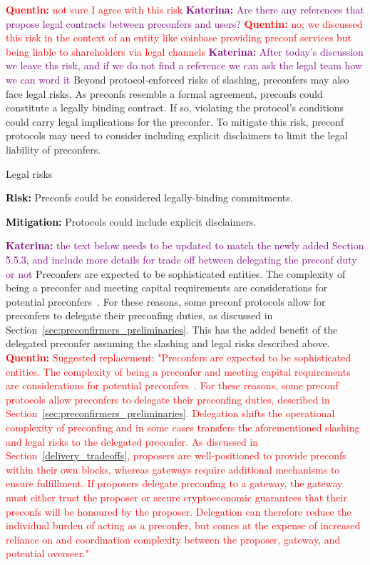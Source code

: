 \documentclass[a4paper]{article}
\theoremstyle{boldstyle}
\newlength{\entrysep}
\newcommand{\risk}[1]{\par\noindent\textbf{\textcolor{black}{Risk:}} #1\par\vspace{\entrysep}}
\newcommand{\mitigation}[1]{\par\noindent\textbf{\textcolor{black}{Mitigation:}} #1}
\newcommand{\qb}[1]{\textcolor{red}{\textbf{Quentin:} #1}}
\newcommand{\ks}[1]{\textcolor{purple}{\textbf{Katerina:} #1}}
\begin{document}
        \qb{not sure I agree with this risk} \ks{Are there any references that propose legal contracts between preconfers and users?} \qb{no; we discussed this risk in the context of an entity like coinbase providing preconf services but being liable to shareholders via legal channels}  \ks{After today's discussion we leave ths risk, and if we do not find a reference we can ask the legal team how we can word it} Beyond protocol-enforced risks of slashing, preconfers may also face legal risks. As preconfs resemble a formal agreement, preconfs could constitute a legally binding contract. If so, violating the protocol's conditions could carry legal implications for the preconfer.
        To mitigate this risk, preconf protocols may need to consider including explicit disclaimers to limit the legal liability of preconfers.
        \begin{riskbox}{Legal risks}
            \risk{Preconfs could be considered legally-binding commitments.}
            \mitigation{Protocols could include explicit disclaimers.}

        \end{riskbox}
        \ks{the text below needs to be updated to match the newly added Section 5.5.3, and include more details for trade off between delegating the preconf duty or not }
        Preconfers are expected to be sophisticated entities. The complexity of being a preconfer and meeting capital requirements are considerations for potential preconfers~\cite{W:Towardsanimplementationofbasedpreconfirmationsleveragingrestaking,W:AnalysingExpectedProposerRevenuefromPreconfirmations}. For these reasons, some preconf protocols allow for preconfers to delegate their preconfing duties, as discussed in Section~\ref{sec:preconfirmers_preliminaries}. This has the added benefit of the delegated preconfer assuming the slashing and legal risks described above. 
        \qb{Suggested replacement: "Preconfers are expected to be sophisticated entities. The complexity of being a preconfer and meeting capital requirements are considerations for potential preconfers~\cite{W:Towardsanimplementationofbasedpreconfirmationsleveragingrestaking,W:AnalysingExpectedProposerRevenuefromPreconfirmations}. For these reasons, some preconf protocols allow preconfers to delegate their preconfing duties, described in Section~\ref{sec:preconfirmers_preliminaries}. Delegation shifts the operational complexity of preconfing and in some cases transfers the aforementioned slashing and legal risks to the delegated preconfer. As discussed in Section~\ref{delivery_tradeoffs}, proposers are well-positioned to provide preconfs within their own blocks, whereas gateways require additional mechanisms to ensure fulfillment. If proposers delegate preconfing to a gateway, the gateway must either trust the proposer or secure cryptoeconomic guarantees that their preconfs will be honoured by the proposer. Delegation can therefore reduce the individual burden of acting as a preconfer, but comes at the expense of increased reliance on and coordination complexity between the proposer, gateway, and potential overseer."
        }
        
\end{document}
